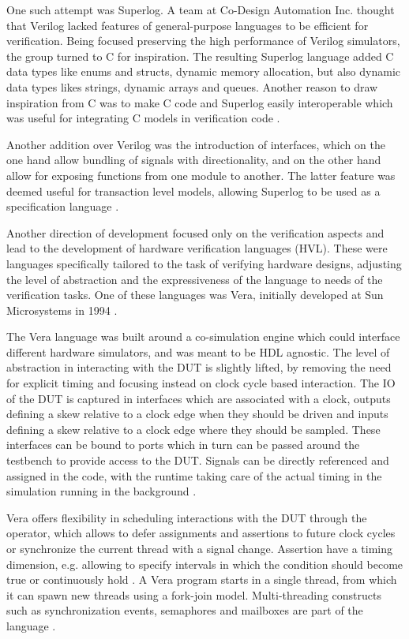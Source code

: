 One such attempt was Superlog. A team at Co-Design Automation Inc. thought that Verilog lacked features of
general-purpose languages to be efficient for verification. Being focused preserving the high performance of Verilog
simulators, the group turned to C for inspiration. The resulting Superlog language added C data types like enums and
structs, dynamic memory allocation, but also dynamic data types likes strings, dynamic arrays and queues. Another
reason to draw inspiration from C was to make C code and Superlog easily interoperable which was useful for
integrating C models in verification code \cite[Sec. 6]{flake2020a}.

Another addition over Verilog was the introduction of interfaces, which on the one hand allow bundling of signals
with directionality, and on the other hand allow for exposing functions from one module to another. The latter
feature was deemed useful for transaction level models, allowing Superlog to be used as a specification language
\cite[Sec. 6]{flake2020a}.

Another direction of development focused only on the verification aspects and lead to the development of hardware
verification languages (HVL). These were languages specifically tailored to the task of verifying hardware designs,
adjusting the level of abstraction and the expressiveness of the language to needs of the verification tasks. One of
these languages was Vera, initially developed at Sun Microsystems in 1994 \cite[Sec. 7]{flake2020a}.

The Vera language was built around a co-simulation engine which could interface different hardware simulators, and
was meant to be HDL agnostic. The level of abstraction in interacting with the DUT is slightly lifted, by removing
the need for explicit timing and focusing instead on clock cycle based interaction. The IO of the DUT is captured in
interfaces which are associated with a clock, outputs defining a skew relative to a clock edge when they should be
driven and inputs defining a skew relative to a clock edge where they should be sampled. These interfaces can be
bound to ports which in turn can be passed around the testbench to provide access to the DUT. Signals can be directly
referenced and assigned in the code, with the runtime taking care of the actual timing in the simulation running in
the background \cite[Sec. 7]{flake2020a}.

Vera offers flexibility in scheduling interactions with the DUT through the \ttt{\@} operator, which allows to defer
assignments and assertions to future clock cycles or synchronize the current thread with a signal change. Assertion
have a timing dimension, e.g. allowing to specify intervals in which the condition should become true or continuously
hold . A Vera program starts in a single thread, from which it can spawn new threads using a fork-join model.
Multi-threading constructs such as synchronization events, semaphores and mailboxes are part of the language
\cite[Sec. 7]{flake2020a}.

